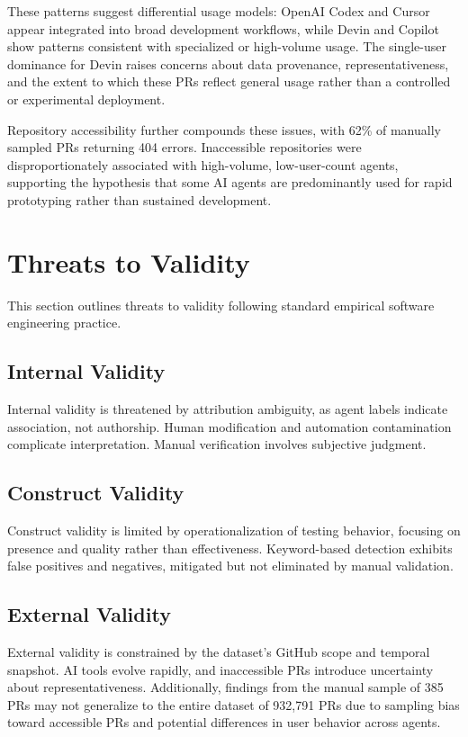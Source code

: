 \documentclass[conference]{IEEEtran}
\begin{document}
These patterns suggest differential usage models: OpenAI Codex and Cursor appear integrated into broad development workflows, while Devin and Copilot show patterns consistent with specialized or high-volume usage. The single-user dominance for Devin raises concerns about data provenance, representativeness, and the extent to which these PRs reflect general usage rather than a controlled or experimental deployment.

Repository accessibility further compounds these issues, with 62\% of manually sampled PRs returning 404 errors. Inaccessible repositories were disproportionately associated with high-volume, low-user-count agents, supporting the hypothesis that some AI agents are predominantly used for rapid prototyping rather than sustained development.

\section{Threats to Validity}

This section outlines threats to validity following standard empirical software engineering practice.

\subsection{Internal Validity}
Internal validity is threatened by attribution ambiguity, as agent labels indicate association, not authorship. Human modification and automation contamination complicate interpretation. Manual verification involves subjective judgment.

\subsection{Construct Validity}
Construct validity is limited by operationalization of testing behavior, focusing on presence and quality rather than effectiveness. Keyword-based detection exhibits false positives and negatives, mitigated but not eliminated by manual validation.

\subsection{External Validity}
External validity is constrained by the dataset's GitHub scope and temporal snapshot. AI tools evolve rapidly, and inaccessible PRs introduce uncertainty about representativeness. Additionally, findings from the manual sample of 385 PRs may not generalize to the entire dataset of 932,791 PRs due to sampling bias toward accessible PRs and potential differences in user behavior across agents.
\end{document}
